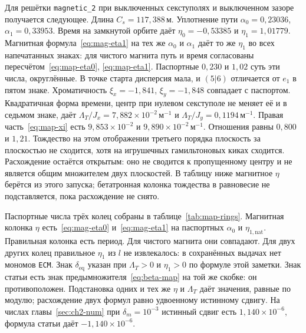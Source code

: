 \documentclass[aps,pra,preprint,a4paper,amsmath,amssymb,longbibliography]{revtex4-2}
\begin{document}
Для решётки \texttt{magnetic\_2} при выключенных секступолях и выключенном зазоре получается следующее. Длина $C_s=117{,}388\,\text{м}$. Уплотнение пути $\alpha_0=0{,}23036$, $\alpha_1=0{,}33953$. Время на замкнутой орбите даёт $\eta_0=-0{,}53385$ и $\eta_1=1{,}01779$. Магнитная формула~\eqref{eq:mag-eta1} на тех же $\alpha_0$ и $\alpha_1$ даёт то же $\eta_1$ во всех напечатанных знаках: для чистого магнита путь и время согласованы пересчётом~\eqref{eq:map-eta0}, \eqref{eq:map-eta1}. Паспортные $0{,}230$ и $1{,}02$ суть эти числа, округлённые. В точке старта дисперсия мала, и $(5|6)$ отличается от $e_1$ в пятом знаке. Хроматичность $\xi_x=-1{,}841$, $\xi_y=-1{,}848$ совпадает с паспортом. Квадратичная форма времени, центр при нулевом секступоле не меняет её и в седьмом знаке, даёт $\Lambda_T/J_x=7{,}882\times 10^{-2}\,\text{м}^{-1}$ и $\Lambda_T/J_y=0{,}1194\,\text{м}^{-1}$. Правая часть~\eqref{eq:map-xi} есть $9{,}853\times 10^{-2}$ и $9{,}890\times 10^{-2}\,\text{м}^{-1}$. Отношения равны $0{,}800$ и $1{,}21$. Тождество на этом отображении третьего порядка плоскость за плоскостью не сходится, хотя на игрушечных гамильтоновых киках сходится. Расхождение остаётся открытым: оно не сводится к пропущенному центру и не является общим множителем двух плоскостей. В таблицу ниже магнитное $\eta$ берётся из этого запуска; бетатронная колонка тождества в равновесие не подставляется, пока расхождение не снято.

Паспортные числа трёх колец собраны в таблице~\ref{tab:map-rings}. Магнитная колонка $\eta$ есть~\eqref{eq:mag-eta0} и~\eqref{eq:mag-eta1} на паспортных $\alpha_0$ и $\eta_{1,\mathrm{nat}}$. Правильная колонка есть период. Для чистого магнита они совпадают. Для двух других колец правильное $\eta_1$ из $l$ не извлекалось: в сохранённых выдачах нет мономов \texttt{ECM}. Знак $\delta_{\mathrm{eq}}$ указан при $\Lambda_T>0$ и $\eta_1>0$ по формуле этой заметки. Знак статьи есть знак предымножителя~\eqref{eq:beta-map} на той же скобке: он противоположен. Подстановка одних и тех же $\eta$ и $\Lambda_T$ даёт значения, равные по модулю; расхождение двух формул равно удвоенному истинному сдвигу. На числах главы~\ref{sec:ch2-num} при $\delta_m=10^{-3}$ истинный сдвиг есть $1{,}140\times 10^{-6}$, формула статьи даёт $-1{,}140\times 10^{-6}$.
\end{document}

